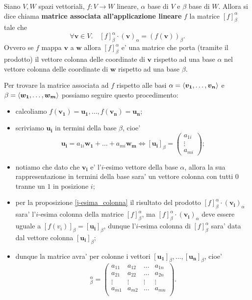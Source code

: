 \begin{definition}\label{matrice_associata}
    Siano $V, W$ spazi vettoriali, $f : V \to W$ lineare, $\alpha$ base di $V$ e $\beta$ base di $W$. Allora si dice chiama \textbf{matrice associata all'applicazione lineare} $f$ la matrice $[f]^{\alpha}_{\beta}$ tale che
    \begin{equation}
        \forall \bm{v} \in V. \quad  [f]^{\alpha}_{\beta} \cdot (\bm{v})_{\alpha}= \left(f(\bm{v}) \right)_{\beta}.
    \end{equation}
    Ovvero se $f$ mappa $\bm{v}$ a $\bm{w}$ allora $[f]^{\alpha}_{\beta}$ e' una matrice che porta (tramite il prodotto) il vettore colonna delle coordinate di $\bm{v}$ rispetto ad una base $\alpha$ nel vettore colonna delle coordinate di $\bm{w}$ rispetto ad una base $\beta$.
\end{definition}

Per trovare la matrice associata ad $f$ rispetto alle basi $\alpha = \left\langle \bm{v_1}, \dots, \bm{v_n} \right\rangle$ e $\beta = \left\langle \bm{w_1}, \dots, \bm{w_m} \right\rangle$ possiamo seguire questo procedimento:
\begin{itemize}
    \item calcoliamo $f(\bm{v_1}) = \bm{u_1}, \dots, f(\bm{v_n}) = \bm{u_n}$;
    \item scriviamo $\bm{u_i}$ in termini della base $\beta$, cioe' \begin{equation*}
        \bm{u_i} = a_{1i}\bm{w_1} + \dots + a_{mi}\bm{w_m} \iff [\bm{u_i}]_{\beta} = \begin{pmatrix}
            a_{1i} \\ \vdots \\ a_{mi}
        \end{pmatrix};
    \end{equation*}
    \item notiamo che dato che $\bm{v_i}$ e' l'$i$-esimo vettore della base $\alpha$, allora la sua rappresentazione in termini della base sara' un vettore colonna con tutti $0$ tranne un $1$ in posizione $i$;
    \item per la proposizione \ref{j-esima_colonna} il risultato del prodotto $[f]^{\alpha}_{\beta} \cdot (\bm{v_i})_{\alpha}$ sara' l'$i$-esima colonna della matrice $[f]^{\alpha}_{\beta}$, ma $[f]^{\alpha}_{\beta} \cdot (\bm{v_i})_{\alpha}$ deve essere uguale a $[f(v_i)]_{\beta} = [\bm{u_i}]_{\beta}$, dunque l'$i$-esima colonna di $[f]^{\alpha}_{\beta}$ sara' data dal vettore colonna $[\bm{u_i}]_{\beta}$;
    \item dunque la matrice avra' per colonne i vettori $[\bm{u_1}]_{\beta}, \dots, [\bm{u_n}]_{\beta}$, cioe'
    \begin{equation}
        [f]^{\alpha}_{\beta} = \begin{pmatrix}
            a_{11} & a_{12} & \dots & a_{1n} \\
            a_{21} & a_{22} & \dots & a_{2n} \\
            \vdots & \vdots & \vdots& \vdots \\
            a_{m1} & a_{m2} & \dots & a_{mn} \\
        \end{pmatrix}.
    \end{equation}
\end{itemize}


